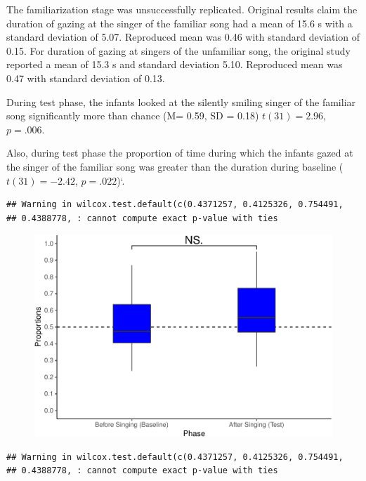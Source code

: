 \documentclass[man,floatsintext]{apa6}
\begin{document}
The familiarization stage was unsuccessfully replicated. Original
results claim the duration of gazing at the singer of the familiar song
had a mean of 15.6 s with a standard deviation of 5.07. Reproduced mean
was 0.46 with standard deviation of 0.15. For duration of gazing at
singers of the unfamiliar song, the original study reported a mean of
15.3 s and standard deviation 5.10. Reproduced mean was 0.47 with
standard deviation of 0.13.

During test phase, the infants looked at the silently smiling singer of
the familiar song significantly more than chance (M= 0.59, SD = 0.18)
\(t(31) = 2.96\), \(p = .006\).

Also, during test phase the proportion of time during which the infants
gazed at the singer of the familiar song was greater than the duration
during baseline (\(t(31) = -2.42\), \(p = .022\))`.

\begin{verbatim}
## Warning in wilcox.test.default(c(0.4371257, 0.4125326, 0.754491,
## 0.4388778, : cannot compute exact p-value with ties
\end{verbatim}

\begin{figure}
\centering
\includegraphics{Midterm_APA_files/figure-latex/unnamed-chunk-2-1.pdf}
\caption{}
\end{figure}

\begin{verbatim}
## Warning in wilcox.test.default(c(0.4371257, 0.4125326, 0.754491,
## 0.4388778, : cannot compute exact p-value with ties
\end{verbatim}
\end{document}

